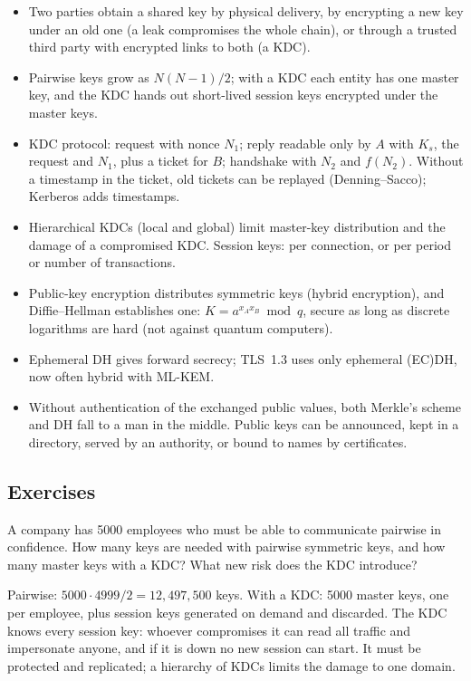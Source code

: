 \begin{summary}
\begin{itemize}
    \item Two parties obtain a shared key by physical delivery, by encrypting a new key under an old one (a leak compromises the whole chain), or through a trusted third party with encrypted links to both (a KDC).
    \item Pairwise keys grow as $N(N-1)/2$; with a KDC each entity has one master key, and the KDC hands out short-lived session keys encrypted under the master keys.
    \item KDC protocol: request with nonce $N_1$; reply readable only by $A$ with $K_s$, the request and $N_1$, plus a ticket for $B$; handshake with $N_2$ and $f(N_2)$. Without a timestamp in the ticket, old tickets can be replayed (Denning--Sacco); Kerberos adds timestamps.
    \item Hierarchical KDCs (local and global) limit master-key distribution and the damage of a compromised KDC. Session keys: per connection, or per period or number of transactions.
    \item Public-key encryption distributes symmetric keys (hybrid encryption), and Diffie--Hellman establishes one: $K = a^{x_A x_B} \bmod q$, secure as long as discrete logarithms are hard (not against quantum computers).
    \item Ephemeral DH gives forward secrecy; TLS~1.3 uses only ephemeral (EC)DH, now often hybrid with ML-KEM.
    \item Without authentication of the exchanged public values, both Merkle's scheme and DH fall to a man in the middle. Public keys can be announced, kept in a directory, served by an authority, or bound to names by certificates.
\end{itemize}
\end{summary}

\subsection*{Exercises}

\begin{exercise}
A company has 5000 employees who must be able to communicate pairwise in confidence. How many keys are needed with pairwise symmetric keys, and how many master keys with a KDC? What new risk does the KDC introduce?
\end{exercise}
\begin{solution}
Pairwise: $5000 \cdot 4999 / 2 = 12{,}497{,}500$ keys. With a KDC: 5000 master keys, one per employee, plus session keys generated on demand and discarded. The KDC knows every session key: whoever compromises it can read all traffic and impersonate anyone, and if it is down no new session can start. It must be protected and replicated; a hierarchy of KDCs limits the damage to one domain.
\end{solution}

